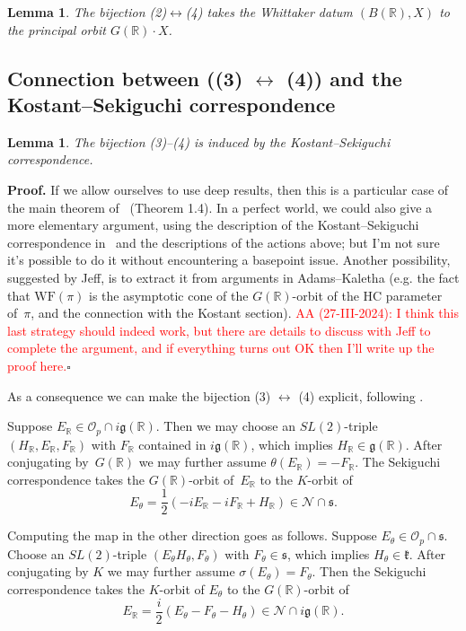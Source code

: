\documentclass[10pt,leqno]{article}
\newtheorem{lemma}[equation]{Lemma}
\newcommand{\qed}{\hfill $\square$ \medskip}
\newenvironment{proof}[1][Proof]{\noindent\textbf{#1.} }{\qed}
\renewcommand{\O}{\mathcal O}
\newcommand{\R}{\mathbb R}
\newcommand{\N}{\mathcal N}
\renewcommand{\k}{\mathfrak k}
\newcommand{\g}{\mathfrak g}
\newcommand{\s}{\mathfrak s}
\newcommand{\WF}{\mathrm{WF}}
\newcommand{\Op}{\O_p}
\begin{document}
\begin{lemma}
The bijection (2)$\leftrightarrow$(4) takes the Whittaker datum $(B(\R),X)$ to
the principal orbit $G(\R)\cdot X$. 
 \end{lemma} 



\subsection{Connection between ((3) $\leftrightarrow$ (4)) and the Kostant--Sekiguchi correspondence } 


\begin{lemma} The bijection (3)--(4) is induced by the Kostant--Sekiguchi correspondence.
\end{lemma} 

\begin{proof} If we allow ourselves to use deep results, then this is a particular case of the main theorem of~\cite{SV1} (Theorem 1.4). In a perfect world, we could also give a more elementary argument, using the description of the Kostant--Sekiguchi correspondence in~\cite{galois} and the descriptions of the actions above; but  I'm not sure it's possible to do it without encountering a basepoint issue. Another possibility, suggested by Jeff, is to extract it from  arguments in Adams--Kaletha (e.g. the fact that $\WF(\pi)$ is the asymptotic cone of the $G(\R)$-orbit of the HC parameter of~$\pi$, and the connection with the Kostant section). \textcolor{red}{AA (27-III-2024): I think this last strategy should indeed work, but there are details to discuss with Jeff to complete the argument, and if everything turns out OK then  I'll write up the proof here.}\end{proof}

As a consequence we can make the bijection (3) $\leftrightarrow$ (4) explicit, following \cite[Section~1]{avav}.


Suppose $E_\R\in \Op\cap i\g(\R)$. Then we may choose an $SL(2)$-triple $(H_\R,E_\R,F_\R)$ with $F_\R$  contained in $i\g(\R)$,
which implies $H_\R\in \g(\R)$. 
After conjugating by~$G(\R)$ we may further assume $\theta(E_\R)=-F_\R$.
The Sekiguchi correspondence takes the $G(\R)$-orbit of~$E_\R$ to the $K$-orbit of
$$
E_\theta=\frac12(-iE_\R-iF_\R+H_\R)\in \N\cap \s.
$$


Computing the map in the other direction goes as follows.
Suppose $E_\theta\in \Op\cap\s$. Choose an $SL(2)$-triple  $(E_\theta H_\theta,F_\theta)$ with
$F_\theta\in\s$, which implies $H_\theta\in\k$. After conjugating by $K$ we may further assume $\sigma(E_\theta)=F_\theta$.
Then the Sekiguchi correspondence takes the $K$-orbit of $E_\theta$ to the $G(\R)$-orbit of 
$$
E_\R=\frac i2(E_\theta-F_\theta-H_\theta)\in\N\cap i\g(\R).
$$
\end{document}
